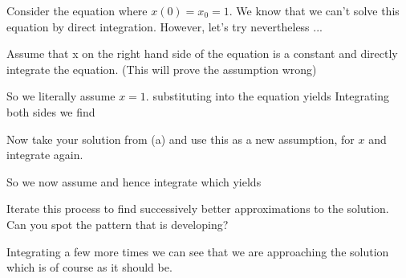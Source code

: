 
Consider the equation
where $x(0)=x_0=1$. We know that we can't solve this equation by direct integration. However, let's try nevertheless ...

\subquestion
Assume that x on the right hand side of the equation is a constant and directly integrate the equation. (This will prove the assumption wrong)

\solution
So we literally assume $x=1$. substituting into the equation yields 
Integrating both sides we find 

\subquestion Now take your solution from (a) and use this as a new assumption, for $x$ and integrate again.

\solution 
So we now assume 
and hence integrate
which yields

\subquestion Iterate this process to find successively better approximations to the solution. Can you spot the pattern that is developing?

\solution
Integrating a few more times we can see that we are approaching the solution 
which is of course as it should be.

